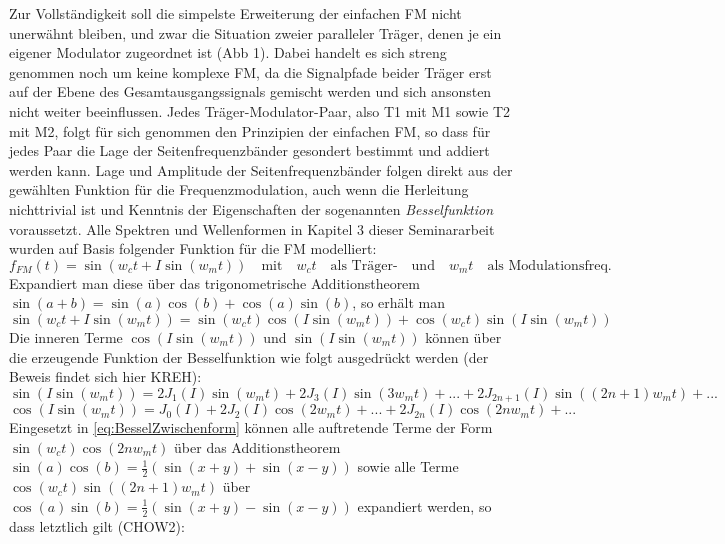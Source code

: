 Zur Vollständigkeit soll die simpelste Erweiterung der einfachen FM nicht unerwähnt bleiben, und zwar die Situation zweier paralleler Träger, denen je ein eigener Modulator zugeordnet ist (Abb 1). Dabei handelt es sich streng genommen noch um keine komplexe FM, da die Signalpfade beider Träger erst auf der Ebene des Gesamtausgangssignals gemischt werden und sich ansonsten nicht weiter beeinflussen. Jedes Träger-Modulator-Paar, also T1 mit M1 sowie T2 mit M2, folgt für sich genommen den Prinzipien der einfachen FM, so dass für jedes Paar die Lage der Seitenfrequenzbänder gesondert bestimmt und addiert werden kann. Lage und Amplitude der Seitenfrequenzbänder folgen direkt aus der gewählten Funktion für die Frequenzmodulation, auch wenn die Herleitung nichttrivial ist und Kenntnis der Eigenschaften der sogenannten \textit{Besselfunktion} voraussetzt. Alle Spektren und Wellenformen in Kapitel 3 dieser Seminararbeit wurden auf Basis folgender Funktion für die FM modelliert:
\begin{equation}\label{eq:SimpleFM}
f_{FM}(t) = \sin(w_ct + I\sin(w_mt)) \quad \text{mit} \quad w_ct \quad \text{als Träger-} \quad \text{und} \quad w_mt \quad \text{als Modulationsfreq.}
\end{equation}
Expandiert man diese über das trigonometrische Additionstheorem \begin{math} \sin(a + b) = \sin(a)\cos(b)+\cos(a)\sin(b) \end{math}, so erhält man 
\begin{equation}\label{eq:BesselZwischenform}
\sin(w_ct + I\sin(w_mt)) = \sin(w_ct)\cos(I\sin(w_mt)) + \cos(w_ct)\sin(I\sin(w_mt))
\end{equation}
Die inneren Terme \begin{math} \cos(I\sin(w_mt)) \end{math} und \begin{math} \sin(I\sin(w_mt)) \end{math} können über die erzeugende Funktion der Besselfunktion wie folgt ausgedrückt werden (der Beweis findet sich hier KREH):
\begin{equation}\label{eq:Besselsin}
\sin(I\sin(w_mt)) = 2J_1(I)\sin(w_mt)+2J_3(I)\sin(3w_mt)+...+2J_{2n+1}(I)\sin((2n+1)w_mt)+...
\end{equation}
\begin{equation}\label{eq:Besselcos}
\cos(I\sin(w_mt)) = J_0(I)+2J_2(I)\cos(2w_mt)+...+2J_{2n}(I)\cos(2nw_mt)+...
\end{equation}
Eingesetzt in \ref{eq:BesselZwischenform} können alle auftretende Terme der Form \begin{math} \sin(w_ct)\cos(2nw_mt) \end{math} über das Additionstheorem \begin{math} \sin(a)\cos(b) = \frac{1}{2}\left(\sin(x+y)+\sin(x-y)\right) \end{math} sowie alle Terme \begin{math} \cos(w_ct)\sin((2n+1)w_mt) \end{math} über  \begin{math} \cos(a)\sin(b) = \frac{1}{2}\left(\sin(x+y)-\sin(x-y)\right) \end{math} expandiert werden, so dass letztlich gilt (CHOW2): 
